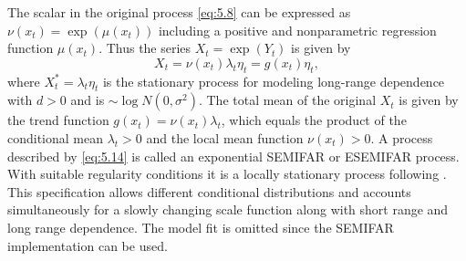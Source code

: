 \documentclass[12pt]{article}
\begin{document}
The scalar in the original process \eqref{eq:5.8} can be expressed as 
$\nu(x_{t}) = \exp(\mu(x_{t}))$
including a positive and nonparametric regression function \(\mu(x_{t})\).
Thus the series \(X_{t} = \exp(Y_{t})\) is given by
\begin{equation}
\label{eq:5.14}
X_{t} = \nu(x_{t})\lambda_{t}\eta_{t} = g(x_{t})\eta_{t},
\end{equation}
where \(X_{t}^{*}  = \lambda_{t}\eta_{t}\) is the stationary process for modeling long-range dependence with \(d > 0\) and is \(\sim \log N(0,\sigma^{2})\).
The total mean of the original \(X_{t}\) is given by the trend function 
$ g(x_{t}) = \nu(x_{t}) \lambda_{t} $,
which equals the product of the conditional mean \(\lambda_{t} > 0\) and the local mean function \(\nu(x_{t}) > 0\).   
A process described by \eqref{eq:5.14} is called an exponential SEMIFAR or ESEMIFAR process.
With suitable regularity conditions it is a locally stationary process following \textcite{dahlhaus1997fitting}. This specification allows different conditional distributions and accounts 	simultaneously for a slowly changing scale function along with short range and long range dependence. The model fit is omitted since the SEMIFAR implementation can be used. 
\end{document}
